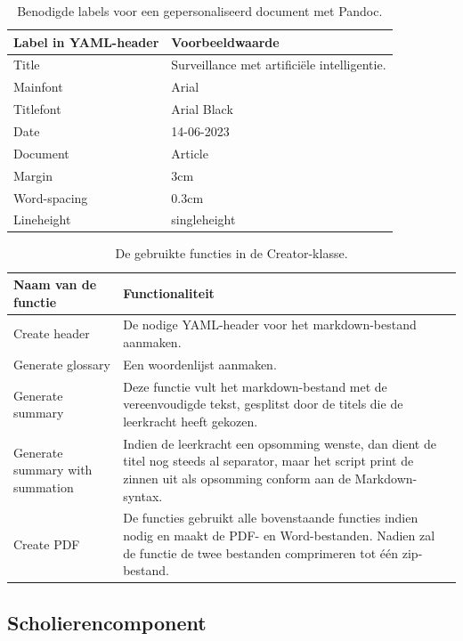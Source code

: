 \begin{table}[H]
	\begin{tabular}{ | m{5cm}| m{5cm} | }
		\hline
		\textbf{Label in YAML-header} & \textbf{Voorbeeldwaarde} \\ \hline
		Title & Surveillance met artificiële intelligentie. \\ \hline
		Mainfont & Arial \\ \hline 
		Titlefont & Arial Black \\ \hline
		Date & 14-06-2023 \\ \hline 
		Document & Article \\ \hline
		Margin & 3cm \\ \hline
		Word-spacing & 0.3cm \\ \hline 
		Lineheight & singleheight \\ \hline
	\end{tabular}
	\caption{Benodigde labels voor een gepersonaliseerd document met Pandoc.}
	\label{table:personalized-pdf-word-document-with-pandoc}
\end{table}

\begin{table}[H]
	\begin{tabular}{ | m{5cm}| m{10cm} | }
		\hline
		Naam van de functie & Functionaliteit \\ \hline
		Create header & De nodige YAML-header voor het markdown-bestand aanmaken. \\ \hline
		Generate glossary & Een woordenlijst aanmaken. \\ \hline
		Generate summary & Deze functie vult het markdown-bestand met de vereenvoudigde tekst, gesplitst door de titels die de leerkracht heeft gekozen. \\ \hline
		Generate summary with summation & Indien de leerkracht een opsomming wenste, dan dient de titel nog steeds al separator, maar het script print de zinnen uit als opsomming conform aan de Markdown-syntax. \\ \hline
		Create PDF & De functies gebruikt alle bovenstaande functies indien nodig en maakt de PDF- en Word-bestanden. Nadien zal de functie de twee bestanden comprimeren tot één zip-bestand. \\ \hline
	\end{tabular}
	\caption{De gebruikte functies in de Creator-klasse.}
	\label{table:functions-creator-class}
\end{table}

\subsection{Scholierencomponent}

